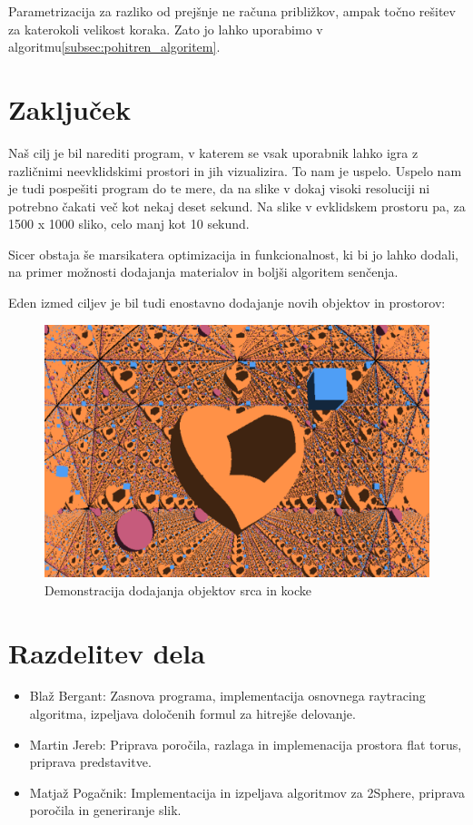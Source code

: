 \documentclass[titlepage]{article}
\begin{document}
Parametrizacija za razliko od prejšnje ne računa približkov, ampak točno rešitev za katerokoli velikost koraka. 
Zato jo lahko uporabimo v algoritmu\ref{subsec:pohitren_algoritem}.

\section{Zaključek}
Naš cilj je bil narediti program, v katerem se vsak uporabnik lahko igra z različnimi neevklidskimi
prostori in jih vizualizira. To nam je uspelo. Uspelo nam je tudi pospešiti program do te mere, da 
na slike v dokaj visoki resoluciji ni potrebno čakati več kot nekaj deset sekund. Na slike v evklidskem 
prostoru pa, za 1500 x 1000 sliko, celo manj kot 10 sekund.

Sicer obstaja še marsikatera optimizacija in funkcionalnost, ki bi jo lahko dodali,
na primer možnosti dodajanja materialov in boljši algoritem senčenja.

Eden izmed ciljev je bil tudi enostavno dodajanje novih objektov in prostorov:

\begin{figure} [H]
  \centering
  \includegraphics[width=0.9\linewidth]{Images/Flat_torus_24mm_heart_cube.png}
  \caption{Demonstracija dodajanja objektov srca in kocke}
  \label{fig:Flat_torus_heart}
\end{figure}







\section{Razdelitev dela}
\begin{itemize}
  \item Blaž Bergant: Zasnova programa, implementacija osnovnega raytracing algoritma, izpeljava določenih formul za hitrejše delovanje.
  \item Martin Jereb: Priprava poročila, razlaga in implemenacija prostora flat torus, priprava predstavitve.
\item Matjaž Pogačnik: Implementacija in izpeljava algoritmov za 2Sphere, priprava poročila in generiranje slik.
\end{itemize}
\end{document}
